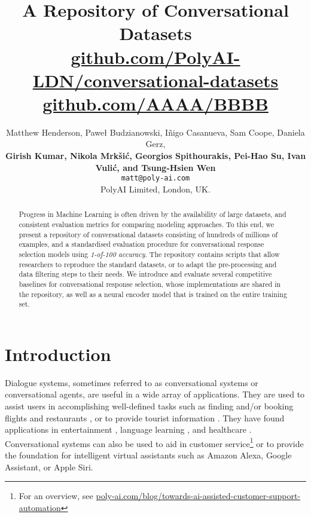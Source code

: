 \documentclass[11pt,a4paper,table]{article}
\title{
    A Repository of Conversational Datasets \\
\ifaclfinal
    {
        \ttfamily \small \href{https://github.com/PolyAI-LDN/conversational-datasets}{github.com/PolyAI-LDN/conversational-datasets}
    }
\else 
	{
        \ttfamily \small \href{https://github.com/AAAA/BBBB}{github.com/AAAA/BBBB}
    }
\fi
}
\author{
 Matthew Henderson,
 Pawe{\l} Budzianowski,
 I{\~{n}}igo Casanueva,
 Sam Coope,
 Daniela Gerz, \\
 {\bf Girish Kumar,
 Nikola Mrk{\v{s}}i\'c,
 Georgios Spithourakis,
 Pei-Hao Su,
 Ivan Vuli\'{c}, and
 Tsung-Hsien Wen
 } \\
 \texttt{\small matt@poly-ai.com} \\
 PolyAI Limited,
 London, UK.
}
\begin{document}
\maketitle

\begin{abstract}
    Progress in Machine Learning is often driven by the availability of large datasets, and consistent evaluation metrics for comparing modeling approaches. To this end, we present a repository of conversational datasets consisting of hundreds of millions of examples, and a standardised evaluation procedure for conversational response selection models using \emph{1-of-100 accuracy}. The repository contains scripts that allow researchers to reproduce the standard datasets, or to adapt the pre-processing and data filtering steps to their needs. We introduce and evaluate several competitive baselines for conversational response selection, whose implementations are shared in the repository, as well as a neural encoder model that is trained on the entire training set.
\end{abstract}

\section{Introduction}


Dialogue systems, sometimes referred to as conversational systems or conversational agents, are useful in a wide array of applications. They are used to assist users in accomplishing well-defined tasks such as finding and/or booking flights and restaurants \cite{Hemphill:1990,Williams:12,ElAsri:2017sigdial}, or to provide tourist information \cite{Henderson:14b,Budzianowski:2018emnlp}. They have found applications in entertainment \cite{Fraser:2018iva}, language learning \cite{Raux:2003,Chen:2017survey}, and healthcare \cite{Laranjo:2018,Fadhil:2019arxiv}. Conversational systems can also be used to aid in customer service\footnote{For an overview, see \ttfamily \scriptsize \href{https://poly-ai.com/blog/towards-ai-assisted-customer-support-automation}{poly-ai.com/blog/towards-ai-{\allowbreak}assisted-customer-support-automation}}
or to provide the foundation for intelligent virtual assistants such as Amazon Alexa, Google Assistant, or Apple Siri.
\end{document}
